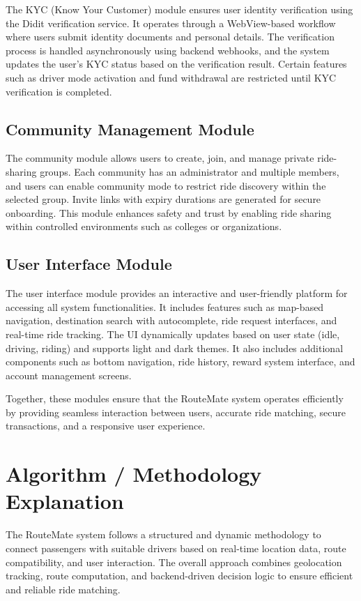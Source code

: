 \documentclass[10pt,a4paper]{report}
\begin{document}
\justify\large The KYC (Know Your Customer) module ensures user identity verification using the Didit verification service. It operates through a WebView-based workflow where users submit identity documents and personal details. The verification process is handled asynchronously using backend webhooks, and the system updates the user’s KYC status based on the verification result. Certain features such as driver mode activation and fund withdrawal are restricted until KYC verification is completed.

\subsection{Community Management Module}

\justify\large The community module allows users to create, join, and manage private ride-sharing groups. Each community has an administrator and multiple members, and users can enable community mode to restrict ride discovery within the selected group. Invite links with expiry durations are generated for secure onboarding. This module enhances safety and trust by enabling ride sharing within controlled environments such as colleges or organizations.

\subsection{User Interface Module}

\justify\large The user interface module provides an interactive and user-friendly platform for accessing all system functionalities. It includes features such as map-based navigation, destination search with autocomplete, ride request interfaces, and real-time ride tracking. The UI dynamically updates based on user state (idle, driving, riding) and supports light and dark themes. It also includes additional components such as bottom navigation, ride history, reward system interface, and account management screens.

\justify\large Together, these modules ensure that the RouteMate system operates efficiently by providing seamless interaction between users, accurate ride matching, secure transactions, and a responsive user experience.

\section{Algorithm / Methodology Explanation}

\justify\large The RouteMate system follows a structured and dynamic methodology to connect passengers with suitable drivers based on real-time location data, route compatibility, and user interaction. The overall approach combines geolocation tracking, route computation, and backend-driven decision logic to ensure efficient and reliable ride matching.
\end{document}
